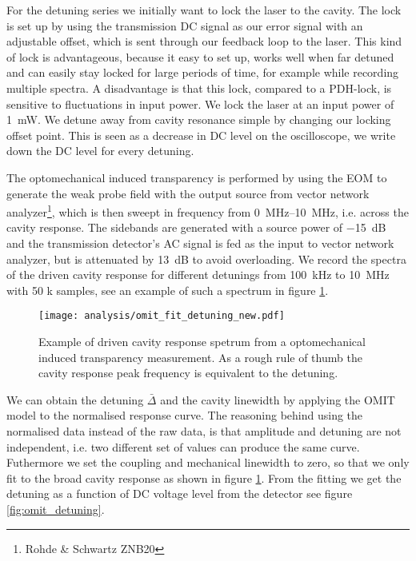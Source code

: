 For the detuning series we initially want to lock the laser to the cavity. The lock is set up by using the transmission DC signal as our error signal with an adjustable offset, which is sent through our feedback loop to the laser. This kind of lock is advantageous, because it easy to set up, works well when far detuned and can easily stay locked for large periods of time, for example while recording multiple spectra. A disadvantage is that this lock, compared to a PDH-lock, is sensitive to fluctuations in input power. We lock the laser at an input power of \SI{1}{\milli\watt}. We detune away from cavity resonance simple by changing our locking offset point. This is seen as a decrease in DC level on the oscilloscope, we write down the DC level for every detuning.

The optomechanical induced transparency is performed by using the EOM to generate the weak probe field with the output source from vector network analyzer\footnote{Rohde \& Schwartz ZNB20}, which is then sweept in frequency from \SIrange{0}{10}{\mega\hertz}, i.e. across the cavity response. The sidebands are generated with a source power of \SI{-15}{\deci\bel\milli} and the transmission detector's AC signal is fed as the input to vector network analyzer, but is attenuated by \SI{13}{\deci\bel} to avoid overloading. We record the spectra of the driven cavity response for different detunings from \SI{100}{\kilo\hertz} to \SI{10}{\mega\hertz} with 50 k samples, see an example of such a spectrum in figure \ref{fig:omit_cavity}.

\begin{figure}[H]
\centering
\texttt{[image: analysis/omit\_fit\_detuning\_new.pdf]}
\caption{Example of driven cavity response spetrum from a optomechanical induced transparency measurement. As a rough rule of thumb the cavity response peak frequency is equivalent to the detuning.}
\label{fig:omit_cavity}
\end{figure}

We can obtain the detuning $\bar{\Delta}$ and the cavity linewidth by applying the OMIT model to the normalised response curve. The reasoning behind using the normalised data instead of the raw data, is that amplitude and detuning are not independent, i.e. two different set of values can produce the same curve. Futhermore we set the coupling and mechanical linewidth to zero, so that we only fit to the broad cavity response as shown in figure \ref{fig:omit_cavity}. From the fitting we get the detuning as a function of DC voltage level from the detector see figure \ref{fig:omit_detuning}.

